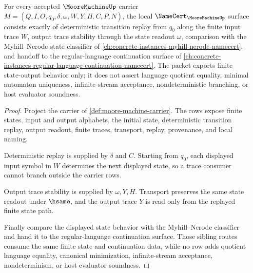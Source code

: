 \begin{theorem}
\label{thm:moore-machine-namecert-obligations}
For every accepted $\MooreMachineUp$ carrier $M=(Q,I,O,q_0,\delta,\omega,W,Y,H,C,P,N)$, the local $\NameCert_{\MooreMachineUp}$ surface consists exactly of deterministic transition replay from $q_0$ along the finite input trace $W$, output trace stability through the state readout $\omega$, comparison with the Myhill--Nerode state classifier of \autoref{ch:concrete-instances-myhill-nerode-namecert}, and handoff to the regular-language continuation surface of \autoref{ch:concrete-instances-regular-language-continuation-namecert}. The packet exports finite state-output behavior only; it does not assert language quotient equality, minimal automaton uniqueness, infinite-stream acceptance, nondeterministic branching, or host evaluator soundness.
\end{theorem}
\begin{proof}
Project the carrier of \autoref{def:moore-machine-carrier}. The rows expose finite states, input and output alphabets, the initial state, deterministic transition replay, output readout, finite traces, transport, replay, provenance, and local naming.

Deterministic replay is supplied by $\delta$ and $C$. Starting from $q_0$, each displayed input symbol in $W$ determines the next displayed state, so a trace consumer cannot branch outside the carrier rows.

Output trace stability is supplied by $\omega,Y,H$. Transport preserves the same state readout under $\hsame$, and the output trace $Y$ is read only from the replayed finite state path.

Finally compare the displayed state behavior with the Myhill--Nerode classifier and hand it to the regular-language continuation surface. Those sibling routes consume the same finite state and continuation data, while no row adds quotient language equality, canonical minimization, infinite-stream acceptance, nondeterminism, or host evaluator soundness.
\end{proof}


